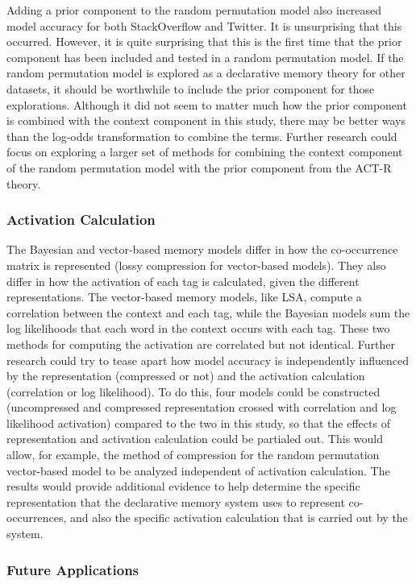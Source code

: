 \documentclass[man,floatsintext,donotrepeattitle]{apa6}
\begin{document}
Adding a prior component to the random permutation model also increased model accuracy for both StackOverflow and Twitter.
It is unsurprising that this occurred.
However, it is quite surprising that this is the first time that the prior component has been included and tested in a random permutation model.
If the random permutation model is explored as a declarative memory theory for other datasets, it should be worthwhile to include the prior component for those explorations.
Although it did not seem to matter much how the prior component is combined with the context component in this study, 
there may be better ways than the log-odds transformation to combine the terms.
Further research could focus on exploring a larger set of methods for combining the context component of the random permutation model with the prior component from the ACT-R theory.

\subsubsection{Activation Calculation}

The Bayesian and vector-based memory models differ in how the co-occurrence matrix is represented (lossy compression for vector-based models).
They also differ in how the activation of each tag is calculated, given the different representations.
The vector-based memory models, like LSA, compute a correlation between the context and each tag, while the Bayesian models sum the log likelihoods that each word in the context occurs with each tag.
These two methods for computing the activation are correlated but not identical.
Further research could try to tease apart how model accuracy is independently influenced by the representation (compressed or not) and the activation calculation (correlation or log likelihood).
To do this, four models could be constructed (uncompressed and compressed representation crossed with correlation and log likelihood activation) compared to the two in this study,
so that the effects of representation and activation calculation could be partialed out.
This would allow, for example, the method of compression for the random permutation vector-based model to be analyzed independent of activation calculation.
The results would provide additional evidence to help determine the specific representation that the declarative memory system uses to represent co-occurrences,
and also the specific activation calculation that is carried out by the system.

\subsubsection{Future Applications}
\end{document}
